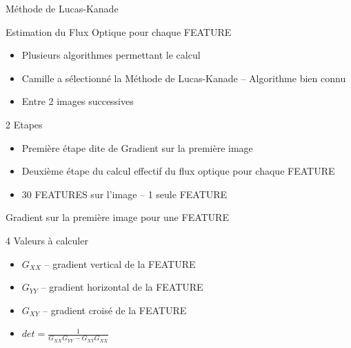 \documentclass{bredelebeamer}
\begin{document}

\begin{frame}{Méthode de Lucas-Kanade}

\begin{block}{Estimation du Flux Optique pour chaque FEATURE}
\begin{itemize}
	\item Plusieurs algorithmes permettant le calcul
	\item Camille a sélectionné la Méthode de Lucas-Kanade -- Algorithme bien connu
	\item Entre 2 images successives
\end{itemize}
\end{block}

\begin{exampleblock}{2 Etapes}
\begin{itemize}
	\item Première étape dite de Gradient sur la première image
	\item Deuxième étape du calcul effectif du flux optique pour chaque FEATURE
	\item 30 FEATURES sur l'image -- 1 seule FEATURE
\end{itemize}
\end{exampleblock}

\end{frame}


\begin{frame}{Gradient sur la première image pour une FEATURE}

	\begin{block}{4 Valeurs à calculer}
\begin{itemize}
	\item $G_{XX}$ -- gradient vertical de la FEATURE
	\item $G_{YY}$ -- gradient horizontal de la FEATURE
	\item $G_{XY}$ -- gradient croisé de la FEATURE
	\item $det = \frac{1}{G_{XX}G_{YY}-G_{XY}G_{XX}}$
\end{itemize}
\end{block}



\end{frame}
\end{document}
